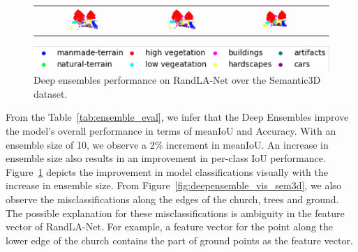 \begin{figure}[h!]
\begin{tabular}{cccc}
            \includegraphics[width=0.30\textwidth, height=0.15\textheight]{images/seg_output/deep_ensembles/2_1.png} &
            \includegraphics[width=0.30\textwidth, height=0.15\textheight]{images/seg_output/deep_ensembles/2_5.png}& 
            \includegraphics[width=0.30\textwidth, height=0.15\textheight]{images/seg_output/deep_ensembles/2_10.png}\\
        \end{tabular}
        \includegraphics[scale=0.65]{images/legend.png}
        \caption{Deep ensembles performance on RandLA-Net over the Semantic3D dataset.}
        \label{fig:deepensemble_improv}
    \end{figure}

    From the Table~\ref{tab:ensemble_eval}, we infer that the Deep Ensembles improve the model's overall performance in terms of meanIoU and Accuracy.
    With an ensemble size of 10, we observe a 2\% increment in meanIoU.
    An increase in ensemble size also results in an improvement in per-class IoU performance.
    Figure~\ref{fig:deepensemble_improv} depicts the improvement in model classifications visually with the increase in ensemble size.
    From Figure~\ref{fig:deepensemble_vis_sem3d}, we also observe the misclassifications along the edges of the church, trees and ground.
    The possible explanation for these misclassifications is ambiguity in the feature vector of RandLA-Net. For example, a feature vector for the point along the lower edge of the church contains the part of ground points as the feature vector.
